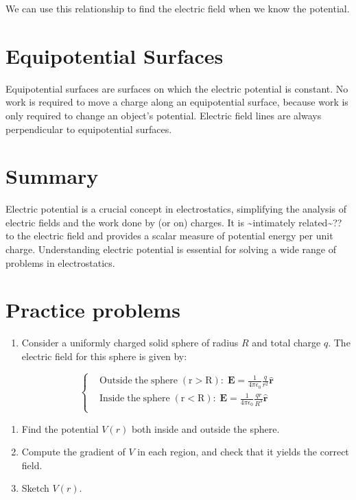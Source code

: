 \documentclass[
  letterpaper,
  DIV=11,
  numbers=noendperiod]{scrreprt}
\providecommand{\tightlist}{%
  \setlength{\itemsep}{0pt}\setlength{\parskip}{0pt}}\usepackage{longtable,booktabs,array}
\begin{document}
We can use this relationship to find the electric field when we know the
potential.

\section{Equipotential Surfaces}\label{equipotential-surfaces}

Equipotential surfaces are surfaces on which the electric potential is
constant. No work is required to move a charge along an equipotential
surface, because work is only required to change an object's potential.
Electric field lines are always perpendicular to equipotential surfaces.

\section{Summary}\label{summary-1}

Electric potential is a crucial concept in electrostatics, simplifying
the analysis of electric fields and the work done by (or on) charges. It
is \textasciitilde intimately related\textasciitilde?? to the electric
field and provides a scalar measure of potential energy per unit charge.
Understanding electric potential is essential for solving a wide range
of problems in electrostatics.

\section{Practice problems}\label{practice-problems-1}

\begin{enumerate}
\def\labelenumi{\arabic{enumi})}
\tightlist
\item
  Consider a uniformly charged solid sphere of radius \(R\) and total
  charge \(q\). The electric field for this sphere is given by:
\end{enumerate}

\[
\left\{
    \begin{aligned}
         & \mathrm{Outside \; the \; sphere \; (r > R):} \; \mathrm{\mathbf{E}}= \frac{1}{4\pi\epsilon_0} \frac{q}{r^2} \hat{\mathrm{\mathbf{r}}}  \\
         & \mathrm{Inside \; the \; sphere \; (r < R):} \; \mathrm{\mathbf{E}}= \frac{1}{4\pi\epsilon_0} \frac{qr}{R^3} \hat{\mathrm{\mathbf{r}}} \\
    \end{aligned}
\right.
\]

\begin{enumerate}
\def\labelenumi{(\alph{enumi})}
\tightlist
\item
  Find the potential \(V(r)\) both inside and outside the sphere.
\item
  Compute the gradient of \(V\) in each region, and check that it yields
  the correct field.
\item
  Sketch \(V(r)\).
\end{enumerate}
\end{document}
